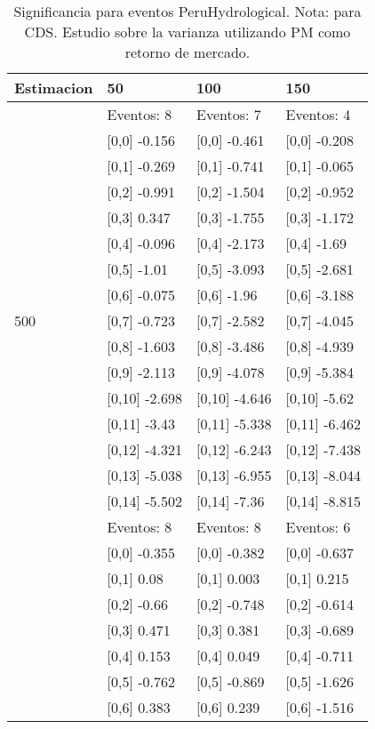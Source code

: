 \begin{table}

\caption{Significancia para eventos PeruHydrological. Nota: para CDS. Estudio sobre la varianza utilizando PM como retorno de mercado.}
\centering
\begin{tabular}[t]{llll}
\toprule
Estimacion & 50 & 100 & 150\\
\midrule
 & Eventos:  8 & Eventos:  7 & Eventos:  4\\
 & {}[0,0] -0.156 & {}[0,0] -0.461 & {}[0,0] -0.208\\
 & {}[0,1] -0.269 & {}[0,1] -0.741 & {}[0,1] -0.065\\
 & {}[0,2] -0.991 & {}[0,2] -1.504 & {}[0,2] -0.952\\
 & {}[0,3] 0.347 & {}[0,3] -1.755 & {}[0,3] -1.172\\
\addlinespace
 & {}[0,4] -0.096 & {}[0,4] -2.173 & {}[0,4] -1.69\\
 & {}[0,5] -1.01 & {}[0,5] -3.093 & {}[0,5] -2.681\\
 & {}[0,6] -0.075 & {}[0,6] -1.96 & {}[0,6] -3.188\\
500 & {}[0,7] -0.723 & {}[0,7] -2.582 & {}[0,7] -4.045\\
 & {}[0,8] -1.603 & {}[0,8] -3.486 & {}[0,8] -4.939\\
\addlinespace
 & {}[0,9] -2.113 & {}[0,9] -4.078 & {}[0,9] -5.384\\
 & {}[0,10] -2.698 & {}[0,10] -4.646 & {}[0,10] -5.62\\
 & {}[0,11] -3.43 & {}[0,11] -5.338 & {}[0,11] -6.462\\
 & {}[0,12] -4.321 & {}[0,12] -6.243 & {}[0,12] -7.438\\
 & {}[0,13] -5.038 & {}[0,13] -6.955 & {}[0,13] -8.044\\
\addlinespace
 & {}[0,14] -5.502 & {}[0,14] -7.36 & {}[0,14] -8.815\\
 & Eventos:  8 & Eventos:  8 & Eventos:  6\\
 & {}[0,0] -0.355 & {}[0,0] -0.382 & {}[0,0] -0.637\\
 & {}[0,1] 0.08 & {}[0,1] 0.003 & {}[0,1] 0.215\\
 & {}[0,2] -0.66 & {}[0,2] -0.748 & {}[0,2] -0.614\\
\addlinespace
 & {}[0,3] 0.471 & {}[0,3] 0.381 & {}[0,3] -0.689\\
 & {}[0,4] 0.153 & {}[0,4] 0.049 & {}[0,4] -0.711\\
 & {}[0,5] -0.762 & {}[0,5] -0.869 & {}[0,5] -1.626\\
 & {}[0,6] 0.383 & {}[0,6] 0.239 & {}[0,6] -1.516\\

\end{tabular}
\end{table}
